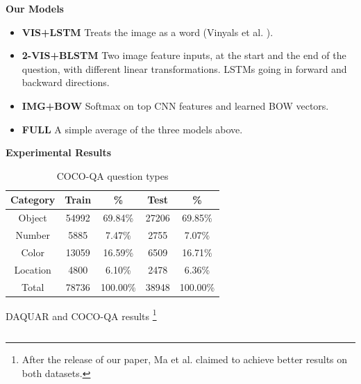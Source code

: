 \documentclass{beamer}
\renewcommand{\*}[1]{\textbf{#1}}
\begin{document}
\begin{frame}{}
\begin{columns}[T]
\begin{column}{0.32\linewidth}
\begin{block}{\bf{\large Our Models}}
\begin{itemize}
\item \*{VIS+LSTM} Treats the image as a word (Vinyals et al. \cite{vinyals14}).

\begin{figure}[t!]
\centering
\small
\scalebox{1.0}{
}
\label{fig:imgword}
\end{figure}
\vskip 0.5in

\item \*{2-VIS+BLSTM} Two image feature inputs, at the start and the end of the
question, with different linear transformations. LSTMs going in forward and
backward directions. 

\item \*{IMG+BOW} Softmax on top CNN features and learned BOW vectors.

\item \*{FULL} A simple average of the three models above.
\end{itemize}
\end{block}
\vfill

\begin{block}{\bf{\large Experimental Results}}

\begin{table}[t!]
\caption{COCO-QA question types}
\small
\label{tab:dataset_category_stats}
\begin{center}

\begin{tabular}{c c c c c}
\hline
Category & Train & \%       & Test  & \%       \\
\hline
Object   & 54992 & 69.84\%  & 27206 & 69.85\%  \\
Number   & 5885  & 7.47\%   & 2755  & 7.07\%   \\
Color    & 13059 & 16.59\%  & 6509  & 16.71\%  \\
Location & 4800  & 6.10\%   & 2478  & 6.36\%   \\
\hline
Total    & 78736 & 100.00\% & 38948 & 100.00\% \\
\hline
\end{tabular}

\end{center}
\end{table}
\vskip 0.4in
\vfill

\begin{table}[t!]
\caption{DAQUAR and COCO-QA results \footnote{After the release of our paper,
Ma et al. \cite{ma15} claimed to achieve better results on both datasets.}}
\small
\label{tab:daquar_results}
\begin{center}


\end{center}
\end{table}
\end{block}
\end{column}
\end{columns}
\end{frame}
\end{document}
